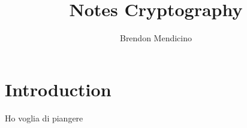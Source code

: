 \documentclass[12pt]{article}
\title{Notes Cryptography}
\author{Brendon Mendicino}
\begin{document}
\maketitle
\newpage
\tableofcontents
\newpage



\section{Introduction}
Ho voglia di piangere
\end{document}
